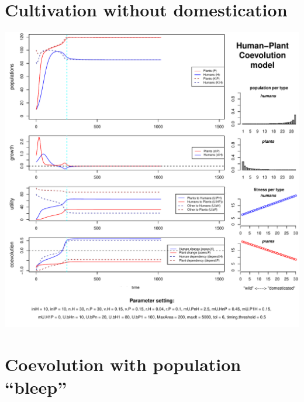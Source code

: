 \documentclass[]{book}
\begin{document}
\newpage

\hypertarget{cultivation-without-domestication}{%
\section{Cultivation without domestication}\label{cultivation-without-domestication}}

\includegraphics{hpcModel-exploration_files/figure-latex/1_run.cult.without.dom-plot-1.pdf}

\newpage

\hypertarget{coevolution-with-population-bleep}{%
\section{Coevolution with population ``bleep''}\label{coevolution-with-population-bleep}}
\end{document}
